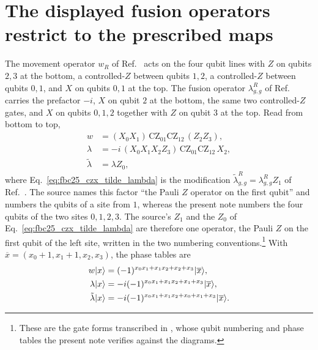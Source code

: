 \documentclass{article}
\begin{document}
\section{The displayed fusion operators restrict to the prescribed maps}

The movement operator $w_R$ of
Ref.~\cite[lines~4860--4888]{FrancoRubio2025MPUGauging} acts on the four
qubit lines with $Z$ on qubits $2,3$ at the bottom, a controlled-$Z$ between
qubits $1,2$, a controlled-$Z$ between qubits $0,1$, and $X$ on qubits $0,1$
at the top. The fusion operator $\lambda^R_{g,g}$ of
Ref.~\cite[lines~4989--5013]{FrancoRubio2025MPUGauging} carries the
prefactor $-i$, $X$ on qubit $2$ at the bottom, the same two controlled-$Z$
gates, and $X$ on qubits $0,1,2$ together with $Z$ on qubit $3$ at the top.
Read from bottom to top,
\begin{align}
    w
        &=(X_0X_1)\,\mathrm{CZ}_{01}\mathrm{CZ}_{12}\,(Z_2Z_3),
    \label{eq:fbc25_czx_w}\\
    \lambda
        &=-i\,(X_0X_1X_2Z_3)\,\mathrm{CZ}_{01}\mathrm{CZ}_{12}\,X_2,
    \label{eq:fbc25_czx_lambda}\\
    \tilde\lambda
        &=\lambda Z_0,
    \label{eq:fbc25_czx_tilde_lambda}
\end{align}
where Eq.~\ref{eq:fbc25_czx_tilde_lambda} is the modification
$\tilde\lambda^R_{g,g}=\lambda^R_{g,g}Z_1$ of
Ref.~\cite[lines~5179--5183]{FrancoRubio2025MPUGauging}. The source names
this factor ``the Pauli $Z$ operator on the first qubit'' and numbers the
qubits of a site from $1$, whereas the present note numbers the four qubits
of the two sites $0,1,2,3$. The source's $Z_1$ and the $Z_0$ of
Eq.~\ref{eq:fbc25_czx_tilde_lambda} are therefore one operator, the Pauli
$Z$ on the first qubit of the left site, written in the two numbering
conventions.\footnote{These are the gate forms
transcribed in , whose
qubit numbering and phase tables the present note verifies against the
diagrams.} With $\overline x=(x_0+1,x_1+1,x_2,x_3)$, the phase tables are
\begin{align}
    w|x\rangle
        &=(-1)^{x_0x_1+x_1x_2+x_2+x_3}|\overline x\rangle,
    \label{eq:fbc25_czx_w_phase}\\
    \lambda|x\rangle
        &=-i(-1)^{x_0x_1+x_1x_2+x_1+x_3}|\overline x\rangle,
    \label{eq:fbc25_czx_lambda_phase}\\
    \tilde\lambda|x\rangle
        &=-i(-1)^{x_0x_1+x_1x_2+x_0+x_1+x_3}|\overline x\rangle.
    \label{eq:fbc25_czx_tilde_lambda_phase}
\end{align}
\end{document}
